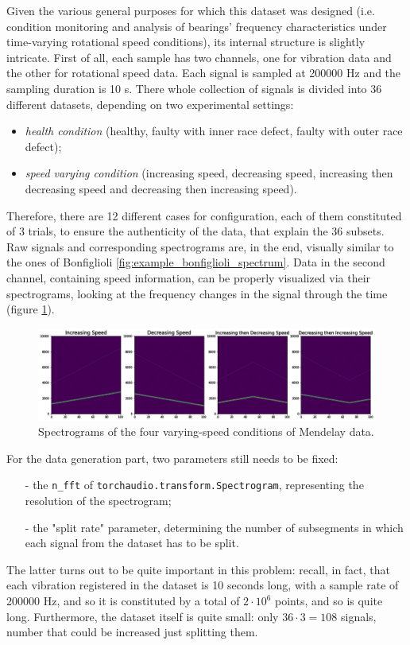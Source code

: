 \documentclass[../main.tex]{subfiles}
\begin{document}
Given the various general purposes for which this dataset was designed (i.e. condition monitoring and analysis of bearings' frequency characteristics under time-varying rotational speed conditions), its internal structure is slightly intricate. First of all, each sample has two channels, one for vibration data and the other for rotational speed data. Each signal is sampled at 200000 Hz and the sampling duration is 10 s. There whole collection of signals is divided into 36 different datasets, depending on two experimental settings:
\begin{itemize}
	\item \textit{health condition} (healthy, faulty with inner race defect, faulty with outer race defect);
	\item \textit{speed varying condition} (increasing speed, decreasing speed, increasing then decreasing speed and decreasing then increasing speed).
\end{itemize} 
Therefore, there are 12 different cases for configuration, each of them constituted of 3 trials, to ensure the authenticity of the data, that explain the 36 subsets. Raw signals and corresponding spectrograms are, in the end, visually similar to the ones of Bonfiglioli \ref{fig:example_bonfiglioli_spectrum}. Data in the second channel, containing speed information, can be properly visualized via their spectrograms, looking at the frequency changes in the signal through the time (figure \ref{fig:mendelay_speed_changes}).
\begin{figure}[ht]
	\centering
	\includegraphics[width=\textwidth]{pictures/mendelay_speed_changes}
	\caption{Spectrograms of the four varying-speed conditions of Mendelay data.}
	\label{fig:mendelay_speed_changes}
\end{figure}
For the data generation part, two parameters still needs to be fixed:
\begin{itemize}
	\item[-] the \texttt{n\_fft} of \texttt{torchaudio.transform.Spectrogram}, representing the resolution of the spectrogram;
	\item[-] the "split rate" parameter, determining the number of subsegments in which each signal from the dataset has to be split.
\end{itemize}
The latter turns out to be quite important in this problem: recall, in fact, that each vibration registered in the dataset is 10 seconds long, with a sample rate of 200000 Hz, and so it is constituted by a total of $2\cdot 10^6$ points, and so is quite long. Furthermore, the dataset itself is quite small: only $36\cdot 3 = 108$ signals, number that could be increased just splitting them.
\end{document}
